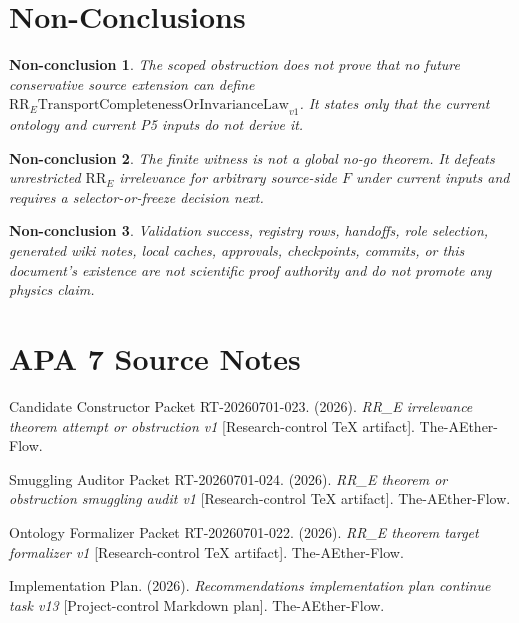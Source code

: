\documentclass[11pt]{article}
\newcommand{\RRE}{\mathrm{RR}_{E}}
\newcommand{\MissingLaw}{\mathrm{RR}_{E}\mathrm{TransportCompletenessOrInvarianceLaw}_{v1}}
\newtheorem{nonconclusion}{Non-conclusion}
\begin{document}
\section{Non-Conclusions}

\begin{nonconclusion}
The scoped obstruction does not prove that no future conservative source
extension can define \(\MissingLaw\). It states only that the current ontology
and current P5 inputs do not derive it.
\end{nonconclusion}

\begin{nonconclusion}
The finite witness is not a global no-go theorem. It defeats unrestricted
\(\RRE\) irrelevance for arbitrary source-side \(F\) under current inputs and
requires a selector-or-freeze decision next.
\end{nonconclusion}

\begin{nonconclusion}
Validation success, registry rows, handoffs, role selection, generated wiki
notes, local caches, approvals, checkpoints, commits, or this document's
existence are not scientific proof authority and do not promote any physics
claim.
\end{nonconclusion}

\section{APA 7 Source Notes}

Candidate Constructor Packet RT-20260701-023. (2026). \emph{RR\_E
irrelevance theorem attempt or obstruction v1} [Research-control TeX
artifact]. The-AEther-Flow.

Smuggling Auditor Packet RT-20260701-024. (2026). \emph{RR\_E theorem or
obstruction smuggling audit v1} [Research-control TeX artifact].
The-AEther-Flow.

Ontology Formalizer Packet RT-20260701-022. (2026). \emph{RR\_E theorem
target formalizer v1} [Research-control TeX artifact]. The-AEther-Flow.

Implementation Plan. (2026). \emph{Recommendations implementation plan
continue task v13} [Project-control Markdown plan]. The-AEther-Flow.
\end{document}
